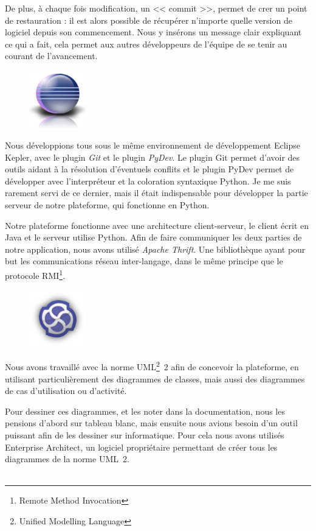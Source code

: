 De plus, à chaque fois modification, un << commit >>, permet de crer un point de restauration : il est alors possible de
récupérer n'importe quelle version de logiciel depuis son commencement. Nous y insérons un message clair expliquant ce qui a fait, cela permet aux autres développeurs de l'équipe de se tenir au courant de l'avancement.

\begin{figure}
	\includegraphics[width=2.5cm]{contents/images/logoEclipse.png}
\end{figure}
Nous développions tous sous le même environnement de développement Eclipse Kepler, avec le plugin \textit{Git} et le plugin \textit{PyDev}. Le plugin Git permet d’avoir des outils aidant à la résolution d’éventuels conflits et le plugin PyDev permet de développer avec l’interpréteur et la coloration syntaxique Python. Je me suis rarement servi de ce dernier, mais il était indispensable pour développer la partie serveur de notre plateforme, qui fonctionne en Python. 

Notre plateforme fonctionne avec une architecture client-serveur, le client écrit en Java et le serveur utilise Python. Afin de faire communiquer les deux parties de notre application, nous avons utilisé \textit{Apache Thrift}. Une bibliothèque ayant pour but les communications réseau inter-langage, dans le même principe que le protocole RMI\footnote{Remote Method Invocation}.

\begin{figure}
	\includegraphics[width=2.5cm]{contents/images/logoEnterpriseArchitect.png}
\end{figure}
Nous avons travaillé avec la norme UML\footnote{Unified Modelling Language}~2 afin de concevoir la plateforme, en utilisant particulièrement des diagrammes de classes, mais aussi des diagrammes de cas d'utilisation ou d'activité. 

Pour dessiner ces diagrammes, et les noter dans la documentation, nous les pensions d'abord sur tableau blanc, mais ensuite nous avions besoin d'un outil puissant afin de les dessiner sur informatique. Pour cela nous avons utilisés Enterprise Architect, un logiciel propriétaire permettant de créer tous les diagrammes de la norme UML~2.\\~

